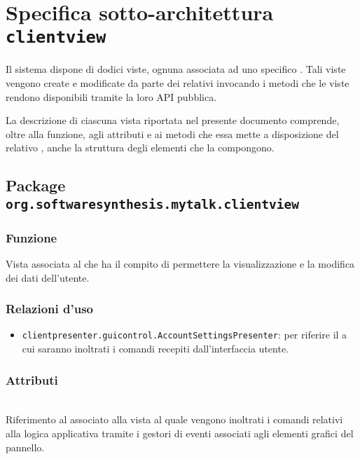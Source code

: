 \clearpage

\section{Specifica sotto-architettura \texttt{clientview}}\label{sec:clientviewarchitecture}
Il sistema dispone di dodici viste, ognuna associata ad uno specifico . Tali viste vengono create e modificate da parte dei relativi  invocando i metodi che le viste rendono disponibili tramite la loro API pubblica.

La descrizione di ciascuna vista riportata nel presente documento comprende, oltre alla funzione, agli attributi e ai metodi che essa mette a disposizione del relativo , anche la struttura degli elementi che la compongono.

\subsection{Package \texttt{org.softwaresynthesis.mytalk.clientview}}

\subsubsection*{Funzione}
Vista associata al   che ha il compito di permettere la visualizzazione e la modifica dei dati dell'utente.

\subsubsection*{Relazioni d'uso}
\begin{itemize}
  \item \texttt{clientpresenter.guicontrol.AccountSettingsPresenter}: per riferire il  a cui saranno inoltrati i comandi recepiti dall'interfaccia utente.
\end{itemize}

\subsubsection*{Attributi}
\begin{description}
  \item{}\\
  Riferimento al  associato alla vista al quale vengono inoltrati i comandi relativi alla logica applicativa tramite i gestori di eventi associati agli elementi grafici del pannello.
\end{description}


